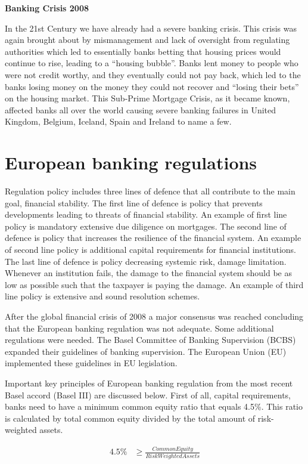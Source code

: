 \documentclass[DIV=calc, paper=a4, fontsize=11pt, twocolumn]{scrartcl}	 %
\begin{document}
\textbf{Banking Crisis 2008}

In the 21st Century we have already had a severe banking crisis. This crisis was again brought about by mismanagement and lack of oversight from regulating authorities which led to essentially banks betting that housing prices would continue to rise, 
leading to a “housing bubble”. Banks lent money to people who were not credit worthy, and they 
eventually could not pay back, which led to the banks losing money on the money they could not recover 
and “losing their bets” on the housing market. This Sub-Prime Mortgage Crisis, as it became known, 
affected banks all over the world causing severe banking failures in United Kingdom, Belgium, Iceland, 
Spain and Ireland to name a few.

\section*{European banking regulations}
Regulation policy includes three lines of defence that all contribute to the main goal, financial stability. The first line of defence is policy that prevents developments leading to threats of financial stability. An example of first line policy is mandatory extensive due diligence on mortgages. The second line of defence is policy that increases the resilience of the financial system. An example of second line policy is additional capital requirements for financial institutions. The last line of defence is policy decreasing systemic risk, damage limitation. Whenever an institution fails, the damage to the financial system should be as low as possible such that the taxpayer is paying the damage. An example of third line policy is extensive and sound resolution schemes.

After the global financial crisis of 2008 a major consensus was reached concluding that the European banking regulation was not adequate. Some additional regulations were needed. The Basel Committee of Banking Supervision (BCBS) expanded their guidelines of banking supervision. The European Union (EU) implemented these guidelines in EU legislation. 

Important key principles of European banking regulation from the most recent Basel accord (Basel III) are discussed below.  
First of all, capital requirements, banks need to have a minimum common equity ratio that equals 4.5\%. 
This ratio is calculated by total common equity divided by the total amount of risk-weighted assets. 

 \begin{equation} \label{eq1}
\begin{split}
4.5\% & \geq \frac{Common Equity}{Risk Weighted Assets}
\end{split}
\end{equation}
\end{document}
